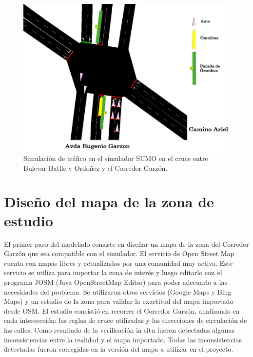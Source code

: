 \begin{figure}[H]
	\centering
	\includegraphics[width=0.9\linewidth]{Figures/sim1}
	\caption[Simulación de trafico en el simulador SUMO.]{Simulación de tráfico en el simulador SUMO en el cruce entre Bulevar Batlle y Ordoñez y el Corredor Garzón.}
	\label{fig:sim1}
\end{figure}





\section{Diseño del mapa de la zona de estudio}

El primer paso del modelado consiste en diseñar un mapa de la zona del Corredor Garzón que sea compatible con el simulador. El servicio de Open Street Map \citep{OSM} cuenta con mapas libres y actualizados por una comunidad muy activa. Este servicio se utiliza para importar la zona de interés y luego editarlo con el programa JOSM (Java OpenStreetMap Editor) para poder adecuarlo a las necesidades del problema.  Se utilizaron otros servicios (Google Maps y Bing Maps) y un estudio de la zona para validar la exactitud del mapa importado desde OSM. El estudio consistió en recorrer el Corredor Garzón, analizando en cada intersección: las reglas de cruce utilizadas y las direcciones de circulación de las calles. Como resultado de la verificación in situ fueron detectadas algunas inconsistencias entre la realidad y el mapa importado. Todas las inconsistencias detectadas fueron corregidas en la versión del mapa a utilizar en el proyecto. 

